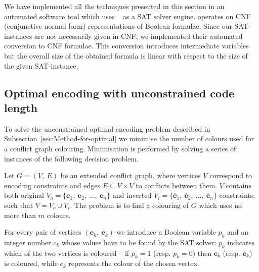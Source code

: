 We have implemented all the techniques presented in this section in
an automated software tool which uses ~\cite{2004_miniSAT_lncs}
as a SAT solver engine.  operates on CNF (conjunctive
normal form) representations of Boolean formulae. Since our SAT-instances
are not necessarily given in CNF, we implemented their automated conversion
to CNF formulae. This conversion introduces intermediate variables
but the overall size of the obtained formula is linear with respect
to the size of the given SAT-instance.



\subsection{Optimal encoding with unconstrained code length}

To solve the unconstrained optimal encoding problem described in Subsection~\ref{sec:Method-for-optimal}
we minimise the number of colours used for a conflict graph colouring.
Minimisation is performed by solving a series of instances of the
following decision problem.

Let $G=(V,\ E)$ be an extended conflict graph, where vertices $V$
correspond to encoding constraints and edges $E\subseteq V\times V$
to conflicts between them. $V$ contains both original $V_{o}=\{\mathbf{e}_{1},\ \mathbf{e}_{2},\ \dots,\ \mathbf{e}_{n}\}$
and inverted $V_{i}=\{\mathbf{\overline{\mathbf{e}}}_{1},\ \mathbf{\overline{\mathbf{e}}}_{2},\ \dots,\ \mathbf{\overline{\mathbf{e}}}_{n}\}$
constraints, such that $V=V_{o}\cup V_{i}$. The problem is to find
a colouring of $G$ which uses no more than $m$ colours.

For every pair of vertices $(\mathbf{e}_{k},\ \mathbf{\overline{\mathbf{e}}}_{k})$
we introduce a Boolean variable $p_{k}$ and an integer number $c_{k}$
whose values have to be found by the SAT solver: $p_{k}$ indicates
which of the two vertices is coloured -- if $p_{k}=1$ (resp. $p_{k}=0$)
then $\mathbf{e}_{k}$ (resp. $\overline{\mathbf{e}}_{k}$) is coloured,
while $c_{k}$ represents the colour of the chosen vertex. 

